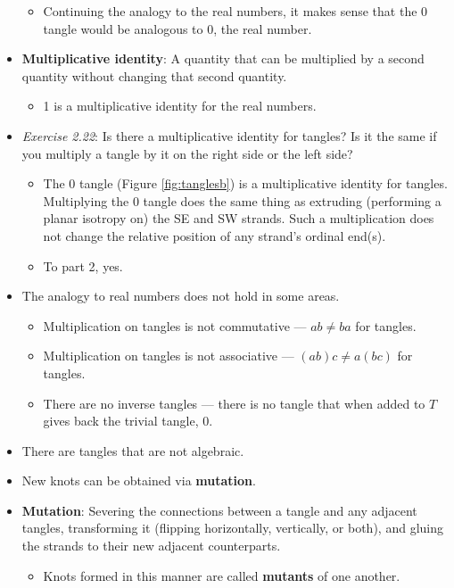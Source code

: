 \documentclass[titlepage]{article}
\numberwithin{figure}{section}
\numberwithin{table}{section}
\numberwithin{equation}{section}
\begin{document}
\begin{itemize}
\begin{itemize}
        \item Continuing the analogy to the real numbers, it makes sense that the 0 tangle would be analogous to 0, the real number.
    \end{itemize}
    \item \textbf{Multiplicative identity}: A quantity that can be multiplied by a second quantity without changing that second quantity.
    \begin{itemize}
        \item 1 is a multiplicative identity for the real numbers.
    \end{itemize}
    \item \emph{Exercise 2.22}: Is there a multiplicative identity for tangles? Is it the same if you multiply a tangle by it on the right side or the left side?
    \begin{itemize}
        \item The 0 tangle (Figure \ref{fig:tanglesb}) is a multiplicative identity for tangles. Multiplying the 0 tangle does the same thing as extruding (performing a planar isotropy on) the SE and SW strands. Such a multiplication does not change the relative position of any strand's ordinal end(s).
        \item To part 2, yes.
    \end{itemize}
    \item The analogy to real numbers does not hold in some areas.
    \begin{itemize}
        \item Multiplication on tangles is not commutative --- $ab\neq ba$ for tangles.
        \item Multiplication on tangles is not associative --- $(ab)c\neq a(bc)$ for tangles.
        \item There are no inverse tangles --- there is no tangle that when added to $T$ gives back the trivial tangle, 0.
    \end{itemize}
    \item There are tangles that are not algebraic.
    \item New knots can be obtained via \textbf{mutation}.
    \item \textbf{Mutation}: Severing the connections between a tangle and any adjacent tangles, transforming it (flipping horizontally, vertically, or both), and gluing the strands to their new adjacent counterparts.
    \begin{itemize}
        \item Knots formed in this manner are called \textbf{mutants} of one another.

\end{itemize}
\end{itemize}
\end{document}
